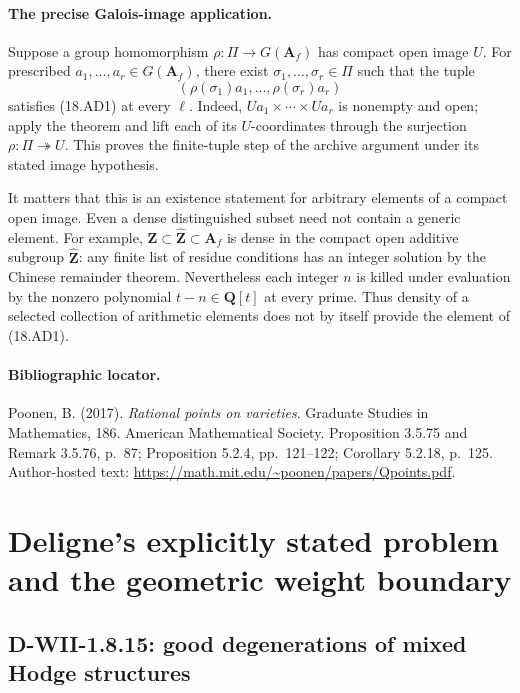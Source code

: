 \documentclass[11pt,a4paper]{article}
\theoremstyle{definition}\newtheorem{definition}[theorem]{Definition}
\theoremstyle{remark}\newtheorem{remark}[theorem]{Remark}
\begin{document}
\paragraph{The precise Galois-image application.}
Suppose a group homomorphism
\(\rho:\Pi\to G(\mathbf A_f)\) has compact open image \(U\).
For prescribed \(a_1,\ldots,a_r\in G(\mathbf A_f)\), there
exist \(\sigma_1,\ldots,\sigma_r\in\Pi\) such that the tuple
\[
       (\rho(\sigma_1)a_1,\ldots,\rho(\sigma_r)a_r)
 \tag{18.AD3}
\]
satisfies (18.AD1) at every \(\ell\).  Indeed,
\(Ua_1\times\cdots\times Ua_r\) is nonempty and open; apply
the theorem and lift each of its \(U\)-coordinates through
the surjection \(\rho:\Pi\twoheadrightarrow U\).
This proves the finite-tuple step of the archive argument under
its stated image hypothesis.

It matters that this is an existence statement for arbitrary
elements of a compact open image.  Even a dense distinguished
subset need not contain a generic element.  For example,
\(\mathbf Z\subset\widehat{\mathbf Z}\subset\mathbf A_f\)
is dense in the compact open additive subgroup
\(\widehat{\mathbf Z}\): any finite list of residue conditions
has an integer solution by the Chinese remainder theorem.
Nevertheless each integer \(n\) is killed under evaluation by
the nonzero polynomial \(t-n\in\mathbf Q[t]\) at every prime.
Thus density of a selected collection of arithmetic elements
does not by itself provide the element of (18.AD1).

\paragraph{Bibliographic locator.}
Poonen, B. (2017). \emph{Rational points on varieties}.
Graduate Studies in Mathematics, 186. American Mathematical Society.
Proposition 3.5.75 and Remark 3.5.76, p.~87;
Proposition 5.2.4, pp.~121--122; Corollary 5.2.18, p.~125.
Author-hosted text:
\url{https://math.mit.edu/~poonen/papers/Qpoints.pdf}.



\section{Deligne's explicitly stated problem and the geometric weight boundary}
\label{sec:deligne-problem}

\subsection{D-WII-1.8.15: good degenerations of mixed Hodge structures}
\end{document}
